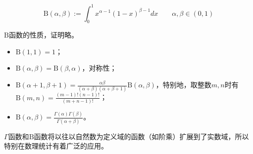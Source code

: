 \begin{definition}
\[
\mathrm{B}\left( \alpha ,\beta \right) :=\int_0^1{x^{\alpha -1}\left( 1-x \right) ^{\beta -1}dx} \qquad \alpha ,\beta \in \left( 0,1 \right)
\]
\end{definition}

$\mathrm{B}$函数的性质，证明略。
\begin{itemize}
    \item $\mathrm{B}\left( 1,1 \right) =1$；
    \item $\mathrm{B}\left( \alpha ,\beta \right) =\mathrm{B}\left( \beta ,\alpha \right) $，对称性；
    \item $\mathrm{B}\left( \alpha +1,\beta +1 \right) =\frac{\alpha \beta}{\left( \alpha +\beta \right) \left( \alpha +\beta +1 \right)}\mathrm{B}\left( \alpha ,\beta \right) $，特别地，取整数$m,n$时有$\mathrm{B}\left( m,n \right) =\frac{\left( m-1 \right) !\left( n-1 \right) !}{\left( m+n-1 \right) !}$；
    \item $\mathrm{B}\left( \alpha ,\beta \right) =\frac{\Gamma \left( \alpha \right) \Gamma \left( \beta \right)}{\Gamma \left( \alpha +\beta \right)}$。
\end{itemize}

\begin{tcolorbox}
$\Gamma $函数和$\mathrm{B}$函数将以往以自然数为定义域的函数（如阶乘）扩展到了实数域，所以特别在数理统计有着广泛的应用。
\end{tcolorbox}



